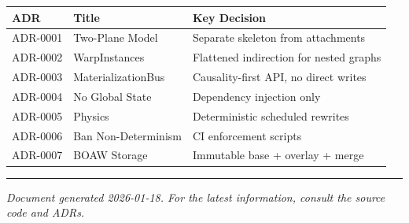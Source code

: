 \documentclass[
]{book}
\newcounter{none} %
\begin{document}
{\def\LTcaptype{none} %
\begin{longtable}[]{@{}
  >{\raggedright\arraybackslash}p{}
  >{\raggedright\arraybackslash}p{}
  >{\raggedright\arraybackslash}p{}@{}}
\toprule\noalign{}
\begin{minipage}[b]{\linewidth}\raggedright
ADR
\end{minipage} & \begin{minipage}[b]{\linewidth}\raggedright
Title
\end{minipage} & \begin{minipage}[b]{\linewidth}\raggedright
Key Decision
\end{minipage} \\
\midrule\noalign{}
\endhead
\bottomrule\noalign{}
\endlastfoot
ADR-0001 & Two-Plane Model & Separate skeleton from attachments \\
ADR-0002 & WarpInstances & Flattened indirection for nested graphs \\
ADR-0003 & MaterializationBus & Causality-first API, no direct writes \\
ADR-0004 & No Global State & Dependency injection only \\
ADR-0005 & Physics & Deterministic scheduled rewrites \\
ADR-0006 & Ban Non-Determinism & CI enforcement scripts \\
ADR-0007 & BOAW Storage & Immutable base + overlay + merge \\
\end{longtable}
}

\begin{center}\rule{0.5\linewidth}{0.5pt}\end{center}

\emph{Document generated 2026-01-18. For the latest information, consult
the source code and ADRs.}

\backmatter
\end{document}

